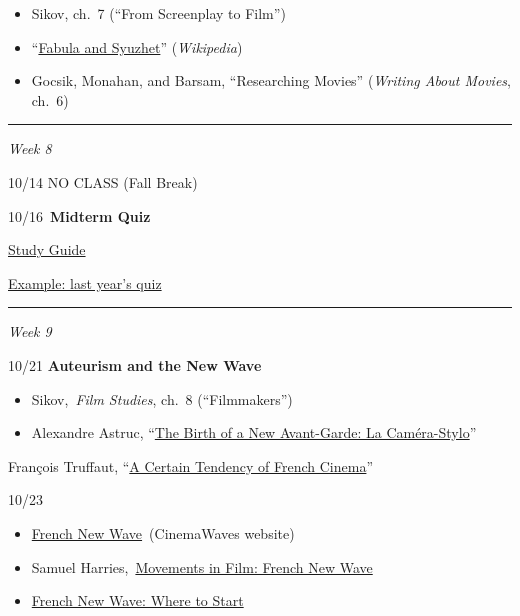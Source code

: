\documentclass[
  letterpaper,
  DIV=11,
  numbers=noendperiod,
  oneside]{scrartcl}
\providecommand{\tightlist}{%
  \setlength{\itemsep}{0pt}\setlength{\parskip}{0pt}}
\begin{document}
\begin{itemize}
\item
  Sikov, ch.~7 (``From Screenplay to Film'')
\item
  ``\href{https://en.wikipedia.org/wiki/Fabula*and*syuzhet}{Fabula and
  Syuzhet}'' (\emph{Wikipedia})
\item
  Gocsik, Monahan, and Barsam, ``Researching Movies'' (\emph{Writing
  About Movies}, ch.~6)
\end{itemize}

\begin{center}\rule{0.5\linewidth}{0.5pt}\end{center}

\emph{Week 8}

10/14 NO CLASS (Fall Break)

10/16~\textbf{Midterm Quiz}

\href{https://franklinpierce.instructure.com/courses/19450/pages/midterm-quiz-study-guide}{Study
Guide}

\href{https://franklinpierce.instructure.com/courses/19450/pages/midterm-quiz-fall-2023}{Example:
last year's quiz}

\begin{center}\rule{0.5\linewidth}{0.5pt}\end{center}

\emph{Week 9}

10/21 \textbf{Auteurism and the New Wave}

\begin{itemize}
\tightlist
\item
  Sikov,~\emph{Film Studies}, ch.~8 (``Filmmakers'')
\item
  Alexandre Astruc,
  ``\href{http://www.newwavefilm.com/about/camera-stylo-astruc.shtml}{The
  Birth of a New Avant-Garde: La Caméra-Stylo}''
\end{itemize}

François Truffaut,
``\href{http://www.newwavefilm.com/about/a-certain-tendency-of-french-cinema-truffaut.shtml}{A
Certain Tendency of French Cinema}''

10/23~

\begin{itemize}
\tightlist
\item
  \href{https://cinemawavesblog.com/movements/french-new-wave/}{French
  New Wave}~(CinemaWaves website)
\item
  Samuel
  Harries,~\href{https://www.movementsinfilm.com/french-new-wave}{Movements
  in Film: French New Wave}
\item
  \href{http://www.newwavefilm.com/new-wave-cinema-guide/nouvelle-vague-where-to-start.shtml}{French
  New Wave: Where to Start}
\end{itemize}
\end{document}
